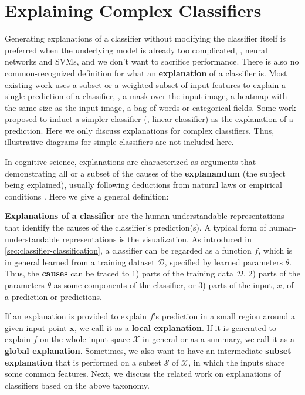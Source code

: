 
\section{Explaining Complex Classifiers}

Generating explanations of a classifier without modifying the classifier itself is preferred when the underlying model is already too complicated, \eg, neural networks and SVMs, and we don't want to sacrifice performance. There is also no common-recognized definition for what an \textbf{explanation} of a classifier is. Most existing work uses a subset or a weighted subset of input features to explain a single prediction of a classifier, \eg, a mask over the input image, a heatmap with the same size as the input image, a bag of words or categorical fields. Some work \cite{ribeiro2016kdd} proposed to induct a simpler classifier (\eg, linear classifier) as the explanation of a prediction. Here we only discuss explanations for complex classifiers. Thus, illustrative diagrams for simple classifiers are not included here.

In cognitive science, explanations are characterized as arguments that demonstrating all or a subset of the causes of the \textbf{explanandum} (the subject being explained), usually following deductions from natural laws or empirical conditions \cite{hempel1948explanation,lombrozo2006explanation}. Here we give a general definition: 

\textbf{Explanations of a classifier} are the human-understandable representations that identify the causes of the classifier's prediction(s). A typical form of human-understandable representations is the visualization. As introduced in \autoref{sec:classifier-classification}, a classifier can be regarded as a function $f$, which is in general learned from a training dataset $\mathcal{D}$, specified by learned parameters $\theta$. Thus, the \textbf{causes} can be traced to 1) parts of the training data $\mathcal{D}$, 2) parts of the parameters $\theta$ as some components of the classifier, or 3) parts of the input, $x$, of a prediction or predictions. 

If an explanation is provided to explain $f$'s prediction in a small region around a given input point $\mathbf{x}$, we call it as a \textbf{local explanation}. If it is generated to explain $f$ on the whole input space $\mathcal{X}$ in general or as a summary, we call it as a \textbf{global explanation}. Sometimes, we also want to have an intermediate \textbf{subset explanation} that is performed on a subset $\mathcal{S}$ of $\mathcal{X}$, in which the inputs share some common features. 
Next, we discuss the related work on explanations of classifiers based on the above taxonomy. 

